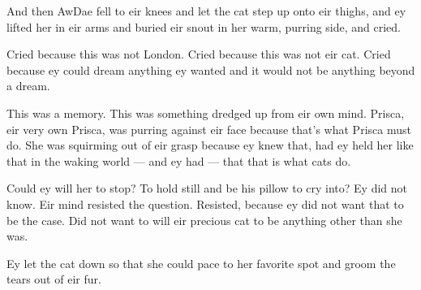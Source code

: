 And then AwDae fell to eir knees and let the cat step up onto eir thighs, and ey lifted her in eir arms and buried eir snout in her warm, purring side, and cried.

Cried because this was not London. Cried because this was not eir cat. Cried because ey could dream anything ey wanted and it would not be anything beyond a dream.

This was a memory. This was something dredged up from eir own mind. Prisca, eir very own Prisca, was purring against eir face because that's what Prisca must do. She was squirming out of eir grasp because ey knew that, had ey held her like that in the waking world — and ey had — that that is what cats do.

Could ey will her to stop? To hold still and be his pillow to cry into? Ey did not know. Eir mind resisted the question. Resisted, because ey did not want that to be the case. Did not want to will eir precious cat to be anything other than she was.

Ey let the cat down so that she could pace to her favorite spot and groom the tears out of eir fur.
